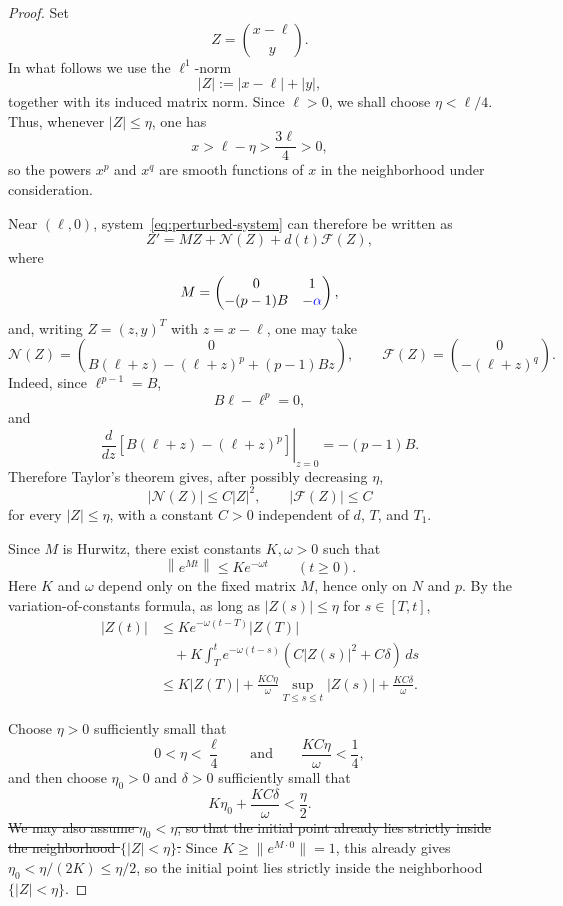 \documentclass[11pt]{article}
\newcommand{\norm}[1]{\left\|#1\right\|}
\newcommand{\add}[1]{{\color{blue}#1}}
\newcommand{\del}[1]{{\color{red}\sout{#1}}}
\newcommand{\oldrev}[1]{#1}
\newcommand{\damp}{\add{\alpha}}            %
\theoremstyle{definition}
\begin{document}
\begin{proof}
Set
\[
Z=
\binom{x-\ell}{y}.
\]
\oldrev{In what follows we use the $\ell^1$-norm
\[
|Z|:=|x-\ell|+|y|,
\]
together with its induced matrix norm.}
Since $\ell>0$, \oldrev{we shall choose} $\eta<\ell/4$.
Thus, whenever
$|Z|\leq\eta$, one has
\[
x>\ell-\eta>\frac{3\ell}{4}>0,
\]
so the powers $x^p$ and $x^q$ are smooth functions of $x$ in the
neighborhood under consideration.

Near $(\ell,0)$, system~\eqref{eq:perturbed-system} can therefore be
written as
\[
Z'
=
MZ+\mathcal N(Z)+d(t)\mathcal F(Z),
\]
where
\[
M=
\begin{pmatrix}
0&1\\
-(p-1)B&-\damp
\end{pmatrix},
\]
\oldrev{and, writing $Z=(z,y)^T$ with $z=x-\ell$, one may take
\[
\mathcal N(Z)
=
\binom{0}{
B(\ell+z)-(\ell+z)^p+(p-1)Bz
},
\qquad
\mathcal F(Z)
=
\binom{0}{-(\ell+z)^q}.
\]
Indeed, since $\ell^{p-1}=B$,
\[
B\ell-\ell^p=0,
\]
and
\[
\left.
\frac{d}{dz}
\left[
B(\ell+z)-(\ell+z)^p
\right]
\right|_{z=0}
=
-(p-1)B.
\]
Therefore Taylor's theorem gives, after possibly decreasing $\eta$,}
\[
|\mathcal N(Z)|
\leq C|Z|^2,
\qquad
|\mathcal F(Z)|
\leq C
\]
\oldrev{for every $|Z|\leq\eta$, with a constant $C>0$
independent of $d$, $T$, and $T_1$.}

Since $M$ is Hurwitz, there exist constants $K,\omega>0$ such that
\[
\norm{e^{Mt}}
\leq
Ke^{-\omega t}
\qquad
(t\geq0).
\]
\oldrev{Here $K$ and $\omega$ depend only on the fixed matrix
$M$, hence only on $N$ and $p$.}
By the variation-of-constants formula, as long as $|Z(s)|\leq\eta$
for $s\in[T,t]$,
\begin{align*}
|Z(t)|
&\leq
Ke^{-\omega(t-T)}|Z(T)|
\\
&\quad
+
K\int_T^t
e^{-\omega(t-s)}
\left(
C|Z(s)|^2
+C\delta
\right)\,ds
\\
&\leq
K|Z(T)|
+
\frac{KC\eta}{\omega}
\sup_{T\leq s\leq t}|Z(s)|
+
\frac{KC\delta}{\omega}.
\end{align*}

Choose $\eta>0$ sufficiently small that
\[
\oldrev{
0<\eta<\frac{\ell}{4}
\qquad\text{and}\qquad
}
\frac{KC\eta}{\omega}<\frac14,
\]
and then choose $\eta_0>0$ and $\delta>0$ sufficiently small that
\[
K\eta_0+\frac{KC\delta}{\omega}
<
\frac{\eta}{2}.
\]
\del{We may also assume $\eta_0<\eta$, so that the initial
point already lies strictly inside the neighborhood
$\{|Z|<\eta\}$.}
\add{Since $K\geq\|e^{M\cdot0}\|=1$, this already gives
$\eta_0<\eta/(2K)\leq\eta/2$, so the initial point lies strictly inside
the neighborhood $\{|Z|<\eta\}$.}


\end{proof}
\end{document}
